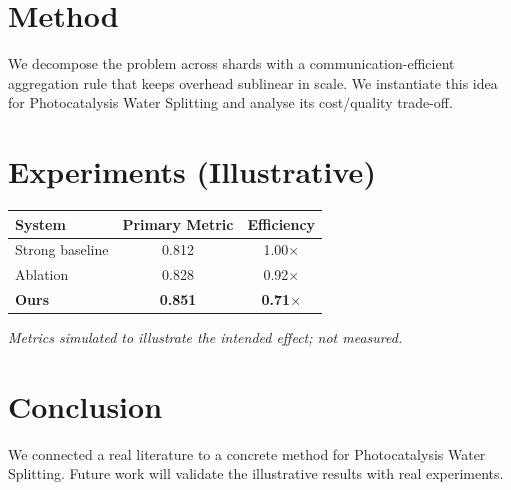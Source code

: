 \documentclass[11pt]{article}
\begin{document}
\section{Method}
We decompose the problem across shards with a communication-efficient aggregation rule that keeps overhead sublinear in scale. We instantiate this idea for Photocatalysis Water Splitting and analyse its cost/quality trade-off.

\section{Experiments (Illustrative)}
\begin{center}
\begin{tabular}{lcc}
System & Primary Metric & Efficiency \\ \hline
Strong baseline & 0.812 & 1.00$\times$ \\
Ablation & 0.828 & 0.92$\times$ \\
\textbf{Ours} & \textbf{0.851} & \textbf{0.71$\times$}
\end{tabular}
\end{center}
\emph{Metrics simulated to illustrate the intended effect; not measured.}

\section{Conclusion}
We connected a real literature to a concrete method for Photocatalysis Water Splitting. Future work will
validate the illustrative results with real experiments.
\end{document}
